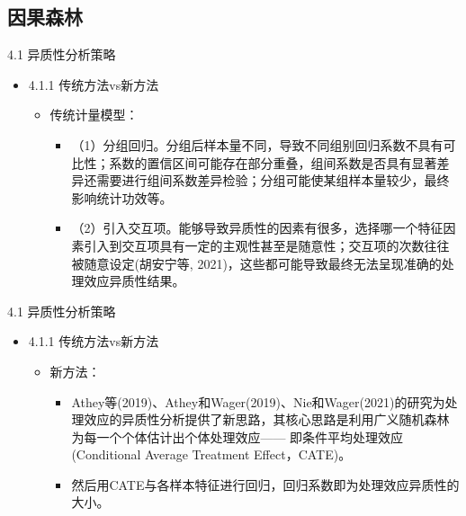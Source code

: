 \documentclass{beamer}%
\begin{document}
\subsection*{因果森林}

\begin{frame}[t]{\large 4.1 异质性分析策略}
\begin{itemize}
  \item 4.1.1 传统方法vs新方法
  \begin{itemize}
  \item 传统计量模型：
  \begin{itemize}
  \item （1）分组回归。分组后样本量不同，导致不同组别回归系数不具有可比性；系数的置信区间可能存在部分重叠，组间系数是否具有显著差异还需要进行组间系数差异检验；分组可能使某组样本量较少，最终影响统计功效等。
  \item （2）引入交互项。能够导致异质性的因素有很多，选择哪一个特征因素引入到交互项具有一定的主观性甚至是随意性；交互项的次数往往被随意设定(胡安宁等, 2021)，这些都可能导致最终无法呈现准确的处理效应异质性结果。
  \end{itemize}
  \end{itemize}
\end{itemize}
\end{frame}

\begin{frame}[t]{\large 4.1 异质性分析策略}
\begin{itemize}
  \item 4.1.1 传统方法vs新方法
  \begin{itemize}
  \item 新方法：
  \begin{itemize}
  \item Athey等(2019)、Athey和Wager(2019)、Nie和Wager(2021)的研究为处理效应的异质性分析提供了新思路，其核心思路是利用广义随机森林为每一个个体估计出个体处理效应—— 即条件平均处理效应(Conditional Average Treatment Effect，CATE)。
  \item 然后用CATE与各样本特征进行回归，回归系数即为处理效应异质性的大小。
  \end{itemize}
  \end{itemize}
\end{itemize}
\end{frame}
\end{document}
